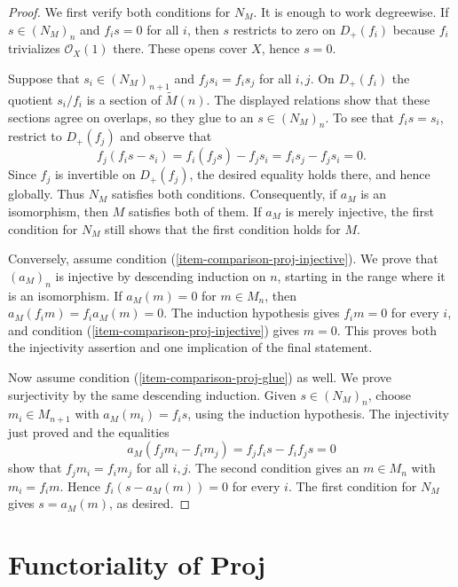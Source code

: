 \begin{proof}
We first verify both conditions for $N_M$. It is enough to work degreewise.
If $s\in (N_M)_n$ and $f_is=0$ for all $i$, then $s$ restricts to zero on
$D_+(f_i)$ because $f_i$ trivializes $\mathcal{O}_X(1)$ there. These opens
cover $X$, hence $s=0$.

Suppose that $s_i\in (N_M)_{n+1}$ and $f_js_i=f_is_j$ for all $i,j$. On
$D_+(f_i)$ the quotient $s_i/f_i$ is a section of $\widetilde M(n)$. The
displayed relations show that these sections agree on overlaps, so they glue
to an $s\in (N_M)_n$. To see that $f_is=s_i$, restrict to $D_+(f_j)$ and
observe that
$$
f_j(f_is-s_i)=f_i(f_js)-f_js_i=f_is_j-f_js_i=0.
$$
Since $f_j$ is invertible on $D_+(f_j)$, the desired equality holds there,
and hence globally. Thus $N_M$ satisfies both conditions. Consequently, if
$a_M$ is an isomorphism, then $M$ satisfies both of them. If $a_M$ is merely
injective, the first condition for $N_M$ still shows that the first condition
holds for $M$.

Conversely, assume condition (\ref{item-comparison-proj-injective}). We prove
that $(a_M)_n$ is injective by descending induction on $n$, starting in the
range where it is an isomorphism. If $a_M(m)=0$ for $m\in M_n$, then
$a_M(f_im)=f_ia_M(m)=0$. The induction hypothesis gives $f_im=0$ for every
$i$, and condition (\ref{item-comparison-proj-injective}) gives $m=0$. This
proves both the injectivity assertion and one implication of the final
statement.

Now assume condition (\ref{item-comparison-proj-glue}) as well. We prove
surjectivity by the same descending induction. Given $s\in (N_M)_n$, choose
$m_i\in M_{n+1}$ with $a_M(m_i)=f_is$, using the induction hypothesis. The
injectivity just proved and the equalities
$$
a_M(f_jm_i-f_im_j)=f_jf_is-f_if_js=0
$$
show that $f_jm_i=f_im_j$ for all $i,j$. The second condition gives an
$m\in M_n$ with $m_i=f_im$. Hence $f_i(s-a_M(m))=0$ for every $i$. The first
condition for $N_M$ gives $s=a_M(m)$, as desired.
\end{proof}










\section{Functoriality of Proj}
\label{section-functoriality-proj}

